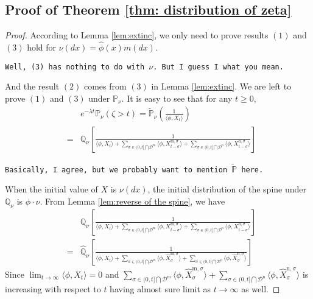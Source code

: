 \documentclass[12pt,a4paper]{amsart}
\numberwithin{equation}{section}
\theoremstyle{plain}
\theoremstyle{definition}
\theoremstyle{remark}
\begin{document}
\subsection{Proof of Theorem \ref{thm: distribution of zeta}}
\begin{proof}
According to Lemma \ref{lem:extinc}, we only need to prove results $(1)$ and $(3)$ hold for $\nu(dx)=\hat\phi(x)m(dx)$.  

{\tt Well, (3) has nothing to do with $\nu$. But I guess I what you mean.}

And the result $(2)$ comes from $(3)$ in Lemma \ref{lem:extinc}.  We are left to prove $(1)$ and $(3)$ under $\mathbb P_{\nu}$.  It is easy to see that for any $t\ge 0,$
\begin{eqnarray*}\label{subcritical equality}
 	&&e^{-\lambda t}\mathbb P_\nu(\zeta>t)=\widetilde{\mathbb P}_\nu\left(\frac{1}{\langle\phi, X_{t}\rangle }\right)\\
 &=&\mathbb Q_{\nu}\left[\frac{1}{\langle\phi, X_{t}\rangle +\sum_{\sigma\in(0, t]\bigcap\mathcal D^{\mathrm m}}\langle \phi, X_{t-\sigma}^{{\mathrm m},\sigma}\rangle +\sum_{\sigma\in (0, t]\bigcap \mathcal D^{\mathrm n}}\langle \phi, X_{t-\sigma}^{{\mathrm n}, \sigma}\rangle} \right]
\end{eqnarray*}
	
	{\tt Basically, I agree, but we probably want to mention $\widetilde {\mathbb P}$ here.}
	
When the initial value of $X$ is $\nu(dx)$, the initial distribution of the spine under $\mathbb Q_\nu$ is $\phi\cdot\nu$.
	From Lemma \ref{lem:reverse of the spine}, we have
\begin{eqnarray*}\label{duality}
    &&  \mathbb Q_{\nu}\left[\frac{1}{\langle\phi, X_{t}\rangle +\sum_{\sigma\in(0, t]\bigcap\mathcal D^{\mathrm m}}\langle \phi, X_{t-\sigma}^{{\mathrm m},\sigma}\rangle +\sum_{\sigma\in (0, t]\bigcap \mathcal D^{\mathrm n}}\langle \phi, X_{t-\sigma}^{{\mathrm n}, \sigma}\rangle }\right]\\
    &=&\widehat{\mathbb Q}_{\nu}\left[\frac{1}{\langle\phi, X_{t}\rangle +\sum_{\sigma\in(0, t]\bigcap\mathcal D^{\mathrm m}}\langle \phi, \widehat X_{\sigma}^{{\mathrm m},\sigma}\rangle +\sum_{\sigma\in (0, t]\bigcap \mathcal D^{\mathrm n}}\langle \phi, \widehat X_{\sigma}^{{\mathrm n},\sigma}\rangle }\right]
\end{eqnarray*}
    Since $\lim_{t\to\infty}\langle\phi, X_{t}\rangle=0$ and $\sum_{\sigma\in(0, t]\bigcap\mathcal D^{\mathrm m}}\langle \phi, \widehat X_{\sigma}^{{\mathrm m},\sigma}\rangle +\sum_{\sigma\in (0, t]\bigcap \mathcal D^{\mathrm n}}\langle \phi, \widehat X_{\sigma}^{{\mathrm n},\sigma}\rangle $ is increasing with respect to $t$ having almost sure limit as $t\to\infty$ as well.  
    

\end{proof}
\end{document}
